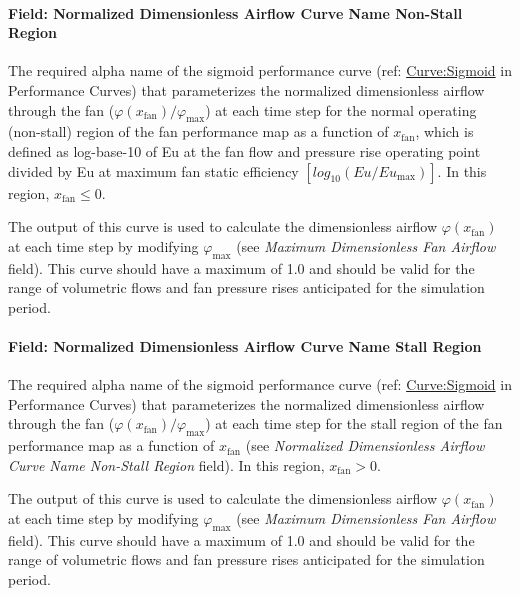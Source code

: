 \paragraph{Field: Normalized Dimensionless Airflow Curve Name Non-Stall Region}\label{field-normalized-dimensionless-airflow-curve-name-non-stall-region}

The required alpha name of the sigmoid performance curve (ref: \hyperref[curvesigmoid]{Curve:Sigmoid} in Performance Curves) that parameterizes the normalized dimensionless airflow through the fan (\(\varphi (x_{\mathrm{fan}}) / \varphi_{\mathrm{max}}\)) at each time step for the normal operating (non-stall) region of the fan performance map as a function of \(x_{\mathrm{fan}}\), which is defined as log-base-10 of Eu at the fan flow and pressure rise operating point divided by Eu at maximum fan static efficiency \([log_{10}(Eu / Eu_{\mathrm{max}})]\). In this region, \(x_{\mathrm{fan}} \le 0\).

The output of this curve is used to calculate the dimensionless airflow \(\varphi (x_{\mathrm{fan}})\) at each time step by modifying \(\varphi_{\mathrm{max}}\) (see \emph{Maximum Dimensionless Fan Airflow} field). This curve should have a maximum of 1.0 and should be valid for the range of volumetric flows and fan pressure rises anticipated for the simulation period.

\paragraph{Field: Normalized Dimensionless Airflow Curve Name Stall Region}\label{field-normalized-dimensionless-airflow-curve-name-stall-region}

The required alpha name of the sigmoid performance curve (ref: \hyperref[curvesigmoid]{Curve:Sigmoid} in Performance Curves) that parameterizes the normalized dimensionless airflow through the fan (\(\varphi (x_{\mathrm{fan}}) / \varphi_{\mathrm{max}}\)) at each time step for the stall region of the fan performance map as a function of \(x_{\mathrm{fan}}\) (see \emph{Normalized Dimensionless Airflow Curve Name Non-Stall Region} field). In this region, \(x_{\mathrm{fan}} > 0\).

The output of this curve is used to calculate the dimensionless airflow \(\varphi (x_{\mathrm{fan}})\) at each time step by modifying \(\varphi_{\mathrm{max}}\) (see \emph{Maximum Dimensionless Fan Airflow} field). This curve should have a maximum of 1.0 and should be valid for the range of volumetric flows and fan pressure rises anticipated for the simulation period.


